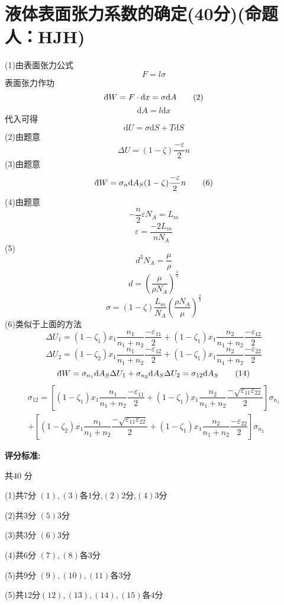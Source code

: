 \documentclass{article}
\newcommand \dbar {{\; \bar{} \hspace{-0.3em} \mathrm d}}
\begin{document}
\section*{液体表面张力系数的确定(40分)(命题人：HJH)}
\[\]
(1)由表面张力公式
\[F=l\sigma\tag{1}\]
表面张力作功
\[\dbar W=F\cdot \mathrm{d}x=\sigma\mathrm{d}A\tag{2}\]
\[\mathrm{d}A=l\mathrm{d}x\tag{3}\]
代入可得
\[\mathrm{d}U=\sigma\mathrm{d}S+T\mathrm{d}S\tag{4}\]
(2)由题意
\[
\Delta U=(1-\zeta)\dfrac{-\varepsilon}{2}n
\tag{5}\]
(3)由题意
\[
\dbar W=\sigma_n\mathrm{d}A_S(1-\zeta)\dfrac{- \varepsilon}{2}n
\tag{6}\]
(4)由题意
\[
-\dfrac{n}{2}\varepsilon N_A=L_m
\tag{7}\]
\[
\varepsilon=\dfrac{-2L_m}{nN_A}
\tag{8}\]
(5)
\[
d^3N_A=\dfrac{\mu}{\rho}
\tag{9}\]
\[
d=\left(\dfrac{\mu}{\rho N_A}\right)^{\frac{1}{3}}
\tag{10}\]
\[
\sigma=(1-\zeta)\dfrac{L_m}{N_A}\left(\dfrac{\rho N_A}{\mu}\right)^{\frac{2}{3}}
\tag{11}\]
(6)类似于上面的方法
\[
\Delta U_1=(1-\zeta_1)x_1\dfrac{n_1}{n_1+n_2}\dfrac{-\varepsilon_{11}}{2}+(1-\zeta_1)x_1\dfrac{n_2}{n_1+n_2}\dfrac{-\varepsilon_{12}}{2}
\tag{12}\]
\[
\Delta U_2=(1-\zeta_2)x_1\dfrac{n_1}{n_1+n_2}\dfrac{-\varepsilon_{12}}{2}+(1-\zeta_1)x_1\dfrac{n_2}{n_1+n_2}\dfrac{-\varepsilon_{22}}{2}
\tag{13}\]
\[
\dbar W=\sigma_{n_1}\mathrm{d} A_S \Delta U_1+\sigma_{n_2}\mathrm{d} A_S \Delta U_2=\sigma_{12}\mathrm{d} A_S
\tag{14}\]
\[
\begin{aligned}
\sigma_{12}=\left[(1-\zeta_1)x_1\dfrac{n_1}{n_1+n_2}\dfrac{-\varepsilon_{11}}{2}+(1-\zeta_1)x_1\dfrac{n_2}{n_1+n_2}\dfrac{-\sqrt{\varepsilon_{11}\varepsilon_{22}}}{2}\right]\sigma_{n_1}\\
+\left[(1-\zeta_2)x_1\dfrac{n_1}{n_1+n_2}\dfrac{-\sqrt{\varepsilon_{11}\varepsilon_{22}}}{2}+(1-\zeta_1)x_1\dfrac{n_2}{n_1+n_2}\dfrac{-\varepsilon_{22}}{2}\right]\sigma_{n_2}
\end{aligned}
\tag{15}\]

\textbf{评分标准:}\par
共$40$ 分\par
(1)共$7$分 $(1),(3)$各$1$分,$(2)$$2$分,$(4)$$3$分\par
(2)共$3$分 $(5)$$3$分\par
(3)共$3$分 $(6)$$3$分\par
(4)共$6$分 $(7),(8)$各$3$分\par
(5)共$9$分 $(9),(10),(11)$各$3$分\par
(5)共$12$分$(12),(13),(14),(15)$各$4$分
\end{document}
